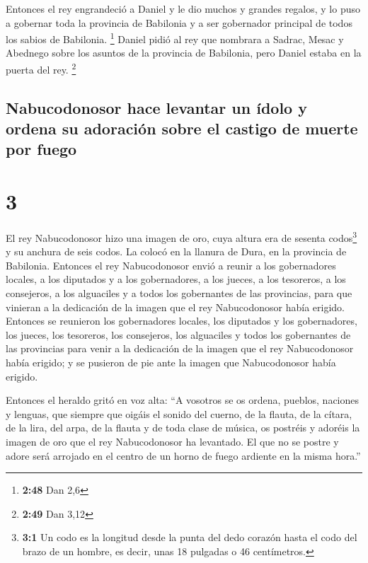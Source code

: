  Entonces el rey engrandeció a Daniel y le dio muchos y
grandes regalos, y lo puso a gobernar toda la provincia de Babilonia y a
ser gobernador principal de todos los sabios de Babilonia. \footnote{\textbf{2:48}
  Dan 2,6}  Daniel pidió al rey que nombrara a Sadrac,
Mesac y Abednego sobre los asuntos de la provincia de Babilonia, pero
Daniel estaba en la puerta del rey. \footnote{\textbf{2:49} Dan 3,12}

\hypertarget{nabucodonosor-hace-levantar-un-uxeddolo-y-ordena-su-adoraciuxf3n-sobre-el-castigo-de-muerte-por-fuego}{%
\subsection{Nabucodonosor hace levantar un ídolo y ordena su adoración
sobre el castigo de muerte por
fuego}\label{nabucodonosor-hace-levantar-un-uxeddolo-y-ordena-su-adoraciuxf3n-sobre-el-castigo-de-muerte-por-fuego}}

\hypertarget{section-2}{%
\section{3}\label{section-2}}

 El rey Nabucodonosor hizo una imagen de oro, cuya altura
era de sesenta codos\footnote{\textbf{3:1} Un codo es la longitud desde
  la punta del dedo corazón hasta el codo del brazo de un hombre, es
  decir, unas 18 pulgadas o 46 centímetros.} y su anchura de seis codos.
La colocó en la llanura de Dura, en la provincia de Babilonia.
 Entonces el rey Nabucodonosor envió a reunir a los
gobernadores locales, a los diputados y a los gobernadores, a los
jueces, a los tesoreros, a los consejeros, a los alguaciles y a todos
los gobernantes de las provincias, para que vinieran a la dedicación de
la imagen que el rey Nabucodonosor había erigido. 
Entonces se reunieron los gobernadores locales, los diputados y los
gobernadores, los jueces, los tesoreros, los consejeros, los alguaciles
y todos los gobernantes de las provincias para venir a la dedicación de
la imagen que el rey Nabucodonosor había erigido; y se pusieron de pie
ante la imagen que Nabucodonosor había erigido.

 Entonces el heraldo gritó en voz alta: ``A vosotros se os
ordena, pueblos, naciones y lenguas,  que siempre que
oigáis el sonido del cuerno, de la flauta, de la cítara, de la lira, del
arpa, de la flauta y de toda clase de música, os postréis y adoréis la
imagen de oro que el rey Nabucodonosor ha levantado.  El
que no se postre y adore será arrojado en el centro de un horno de fuego
ardiente en la misma hora.''

